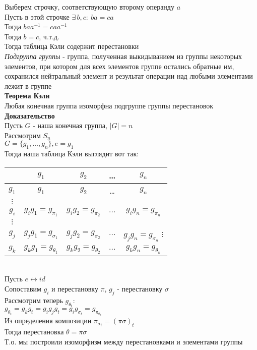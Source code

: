\documentclass[12pt]{article}
\begin{document}
Выберем строчку, соответствующую второму операнду $a$\\
Пусть в этой строчке $\exists\,b,c:\ ba=ca$\\
Тогда $baa^{-1} = caa^{-1}$\\
Тогда $b = c$, ч.т.д.\\
Тогда таблица Кэли содержит перестановки\\
\textit{Подгруппа группы} - группа, полученная выкидыванием из группы некоторых элементов, при котором для всех элементов группе остались обратные им, сохранился нейтральный элемент и результат операции над любыми элементами лежит в группе\\
\textbf{Теорема Кэли}\\
Любая конечная группа изоморфна подгруппе группы перестановок\\
\textbf{Доказательство}\\
Пусть $G$ - наша конечная группа, $|G| = n$\\
Рассмотрим $S_n$\\
$G = \{g_1,\ldots,g_n\}, e = g_1$\\
Тогда наша таблица Кэли выглядит вот так:\\
\begin{tabular}{c|c c c c}
     & $g_1$ & $g_2$ & \ldots & $g_n$ \\
     \hline
     $g_1$ & $g_1$ & $g_2$ & \ldots & $g_n$\\
     $\vdots$\\
     $g_i$ & $g_ig_1 = g_{\pi_1}$ & $g_ig_2=g_{\pi_2}$ & $\ldots$ & $g_ig_n = g_{\pi_n}$ \\
     $\vdots$\\
     $g_j$ & $g_jg_1 = g_{\sigma_1}$ & $g_jg_2=g_{\sigma_2}$ & $\ldots$ & $g_jg_n = g_{\sigma_n}$ 
     $\vdots$\\
     $g_k$ & $g_kg_1 = g_{\theta_1}$ & $g_kg_2=g_{\theta_2}$ & $\ldots$ & $g_kg_n = g_{\theta_n}$ 
\end{tabular}\\
Пусть $e \leftrightarrow id$\\
Сопоставим $g_i$ и перестановку $\pi$, $g_j$ - перестановку $\sigma$\\
Рассмотрим теперь $g_{\theta_t}:$\\
$g_{\theta_t} = g_kg_t = g_ig_jg_t = g_ig_{\sigma_t} = g_{\pi_{\sigma_t}}$\\
Из определения композиции $\pi_{\sigma_t} = (\pi\sigma)_t$\\
Тогда перестановка $\theta = \pi\sigma$\\
Т.о. мы построили изоморфизм между перестановками и элементами группы
\end{document}

